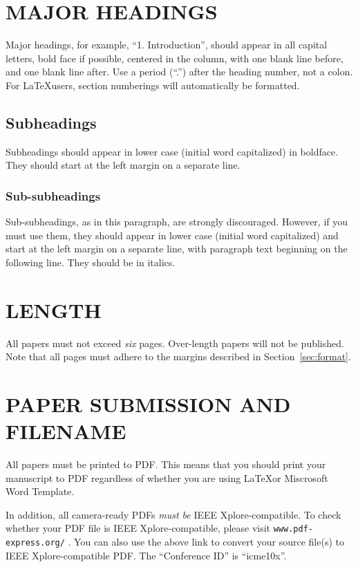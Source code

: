 \documentclass{article}
\begin{document}
\section{MAJOR HEADINGS}
\label{sec:majhead}

Major headings, for example, ``1. Introduction'', should appear in
all capital letters, bold face if possible, centered in the column,
with one blank line before, and one blank line after. Use a period
(``.'') after the heading number, not a colon. For \LaTeX users,
section numberings will automatically be formatted.

\subsection{Subheadings}
\label{ssec:subhead}

Subheadings should appear in lower case (initial word capitalized) in
boldface.  They should start at the left margin on a separate line.

\subsubsection{Sub-subheadings}
\label{sssec:subsubhead}

Sub-subheadings, as in this paragraph, are strongly discouraged.
However, if you must use them, they should appear in lower case
(initial word capitalized) and start at the left margin on a
separate line, with paragraph text beginning on the following line.
They should be in italics.


\section{LENGTH}
\label{sec:length}

All papers must not exceed \emph{six} pages. Over-length papers will
not be published. Note that all pages must adhere to the margins
described in Section~\ref{sec:format}.


\section{PAPER SUBMISSION AND FILENAME}
\label{sec:paperSub}

All papers must be printed to PDF. This means that you should print
your manuscript to PDF regardless of whether you are using \LaTeX or
Miscrosoft Word Template.

In addition, all camera-ready PDFs \emph{must be} IEEE
Xplore-compatible. To check whether your PDF file is IEEE
Xplore-compatible, please visit \verb"www.pdf-express.org/" . You
can also use the above link to convert your source file(s) to IEEE
Xplore-compatible PDF. The ``Conference ID'' is ``icme10x''.
\end{document}

